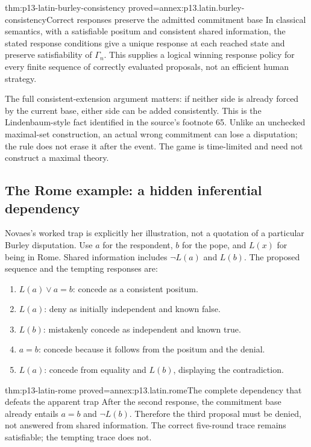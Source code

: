 \begin{hblemma}{thm:p13-latin-burley-consistency}
 {proved=annex:p13.latin.burley-consistency}{Correct responses preserve the admitted commitment base}
In classical semantics, with a satisfiable positum and consistent shared
information, the stated response conditions give a unique response at
each reached state and preserve satisfiability of \(\Gamma_n\).
This supplies a logical winning response policy for every finite sequence
of correctly evaluated proposals, not an efficient human strategy.
\end{hblemma}

The full consistent-extension argument matters: if neither side is already
forced by the current base, either side can be added consistently.
This is the Lindenbaum-style fact identified in the source's footnote 65.
Unlike an unchecked maximal-set construction, an actual wrong commitment
can lose a disputation; the rule does not erase it after the event.
The game is time-limited and need not construct a maximal theory.

\subsection{The Rome example: a hidden inferential dependency}

Novaes's worked trap is explicitly her illustration, not a quotation of
a particular Burley disputation. Use \(a\) for the respondent, \(b\)
for the pope, and \(L(x)\) for being in Rome.
Shared information includes \(\neg L(a)\) and \(L(b)\).
The proposed sequence and the tempting responses are:

\begin{enumerate}
\item \(L(a)\lor a=b\): concede as a consistent positum.
\item \(L(a)\): deny as initially independent and known false.
\item \(L(b)\): mistakenly concede as independent and known true.
\item \(a=b\): concede because it follows from the positum and the denial.
\item \(L(a)\): concede from equality and \(L(b)\), displaying the contradiction.
\end{enumerate}

\begin{hblemma}{thm:p13-latin-rome}
 {proved=annex:p13.latin.rome}{The complete dependency that defeats the apparent trap}
After the second response, the commitment base already entails
\(a=b\) and \(\neg L(b)\). Therefore the third proposal must be denied,
not answered from shared information. The correct five-round trace
remains satisfiable; the tempting trace does not.
\end{hblemma}

